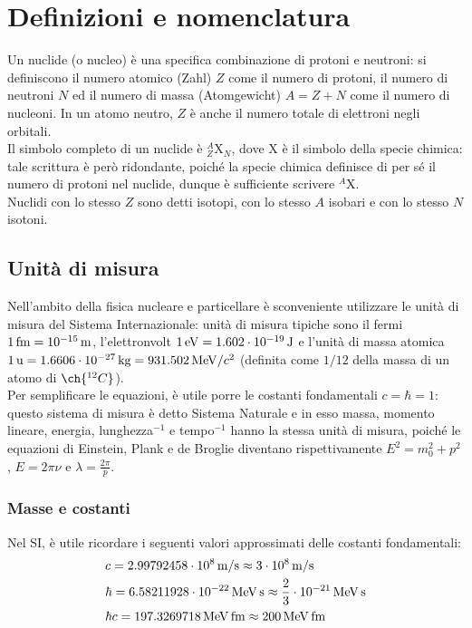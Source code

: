 \section{Definizioni e nomenclatura}

Un nuclide (o nucleo) è una specifica combinazione di protoni e neutroni: si definiscono il numero atomico (Zahl) $ Z $ come il numero di protoni, il numero di neutroni $ N $ ed il numero di massa (Atomgewicht) $ A = Z + N $ come il numero di nucleoni. In un atomo neutro, $ Z $ è anche il numero totale di elettroni negli orbitali.\\
Il simbolo completo di un nuclide è $ ^A_Z \text{X}_N $, dove $ \text{X} $ è il simbolo della specie chimica: tale scrittura è però ridondante, poiché la specie chimica definisce di per sé il numero di protoni nel nuclide, dunque è sufficiente scrivere $ ^A \text{X} $.\\
Nuclidi con lo stesso $ Z $ sono detti isotopi, con lo stesso $ A $ isobari e con lo stesso $ N $ isotoni.

\subsection{Unità di misura}

Nell'ambito della fisica nucleare e particellare è sconveniente utilizzare le unità di misura del Sistema Internazionale: unità di misura tipiche sono il fermi $ 1\,\mathrm{fm} = 10^{-15}\,\mathrm{m} $, l'elettronvolt $ 1\,\mathrm{eV} = 1.602\cdot10^{-19}\,\text{J} $ e l'unità di massa atomica $ 1\,\text{u} = 1.6606\cdot10^{-27}\,\text{kg} = 931.502 \,\mathrm{MeV}/c^2 $ (definita come $ 1/12 $ della massa di un atomo di $ \ch{^{12}C} $).\\
Per semplificare le equazioni, è utile porre le costanti fondamentali $ c = \hbar = 1 $: questo sistema di misura è detto Sistema Naturale e in esso massa, momento lineare, energia, lunghezza$ ^{-1} $ e tempo$ ^{-1} $ hanno la stessa unità di misura, poiché le equazioni di Einstein, Plank e de Broglie diventano rispettivamente $ E^2 = m_0^2 + p^2 $, $ E = 2\pi \nu $ e $ \lambda = \frac{2\pi}{p} $.

\subsubsection{Masse e costanti}

Nel SI, è utile ricordare i seguenti valori approssimati delle costanti fondamentali:
\begin{equation*}
    \begin{split}
	  &c = 2.99792458\cdot10^8 \,\mathrm{m}/\text{s} \approx 3\cdot10^8 \,\mathrm{m}/\text{s}\\
	  &\hbar = 6.58211928\cdot10^{-22} \,\mathrm{MeV}\,\text{s} \approx \frac{2}{3}\cdot10^{-21} \,\mathrm{MeV}\,\text{s}\\
	  &\hbar c = 197.3269718 \,\mathrm{MeV}\,\mathrm{fm} \approx 200 \,\mathrm{MeV}\,\mathrm{fm}
    \end{split}
\end{equation*}

